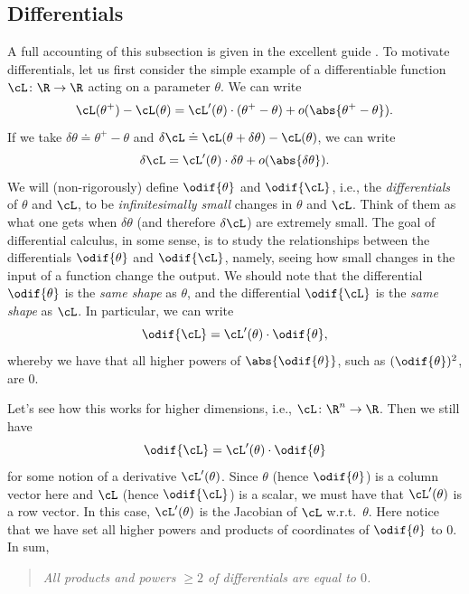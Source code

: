 \documentclass[../../book-main.tex]{subfiles}
\begin{document}
\subsection{Differentials}

A full accounting of this subsection is given in the excellent guide
\cite{bright2025matrix}. To motivate differentials, let us first
consider the simple example of a differentiable function \(\cL \colon
\R \to \R\) acting on a parameter \(\theta\). We can write
\begin{equation}
    \cL(\theta^{+}) - \cL(\theta) =
    \cL^{\prime}(\theta)\cdot(\theta^{+} - \theta) +
    o(\abs{\theta^{+} - \theta}).
\end{equation}
If we take \(\delta\theta \doteq \theta^{+} - \theta\) and
\(\delta\cL \doteq \cL(\theta + \delta\theta) - \cL(\theta)\), we can write
\begin{equation}
    \delta\cL = \cL^{\prime}(\theta)\cdot\delta\theta + o(\abs{\delta\theta}).
\end{equation}
We will (non-rigorously) define \(\odif{\theta}\) and \(\odif{\cL}\),
i.e., the \textit{differentials} of \(\theta\) and \(\cL\), to be
\textit{infinitesimally small} changes in \(\theta\) and \(\cL\).
Think of them as what one gets when \(\delta\theta\) (and therefore
\(\delta \cL\)) are extremely small. The goal of differential
calculus, in some sense, is to study the relationships between the
differentials \(\odif{\theta}\) and \(\odif{\cL}\), namely, seeing
how small changes in the input of a function change the output. We
should note that the differential \(\odif{\theta}\) is the
\textit{same shape} as \(\theta\), and the differential
\(\odif{\cL}\) is the \textit{same shape} as \(\cL\). In particular,
we can write
\begin{equation}
    \odif{\cL} = \cL^{\prime}(\theta)\cdot\odif{\theta},
\end{equation}
whereby we have that all higher powers of \(\abs{\odif{\theta}}\),
such as \((\odif{\theta})^{2}\), are \(0\).

Let's see how this works for higher dimensions, i.e., \(\cL \colon
\R^{n} \to \R\). Then we still have
\begin{equation}
    \odif{\cL} = \cL^{\prime}(\theta)\cdot\odif{\theta}
\end{equation}
for some notion of a derivative \(\cL^{\prime}(\theta)\). Since
\(\theta\) (hence \(\odif{\theta}\)) is a column vector here and
\(\cL\) (hence \(\odif{\cL}\)) is a scalar, we must have that
\(\cL^{\prime}(\theta)\) is a row vector. In this case,
\(\cL^{\prime}(\theta)\) is the Jacobian of \(\cL\)
w.r.t.~\(\theta\). Here notice that we have set all higher powers and
products of coordinates of \(\odif{\theta}\)  to \(0\). In sum,
\begin{quote}
    \centering
    \textit{All products and powers \(\geq 2\) of differentials are
    equal to \(0\).}
\end{quote}
\end{document}
